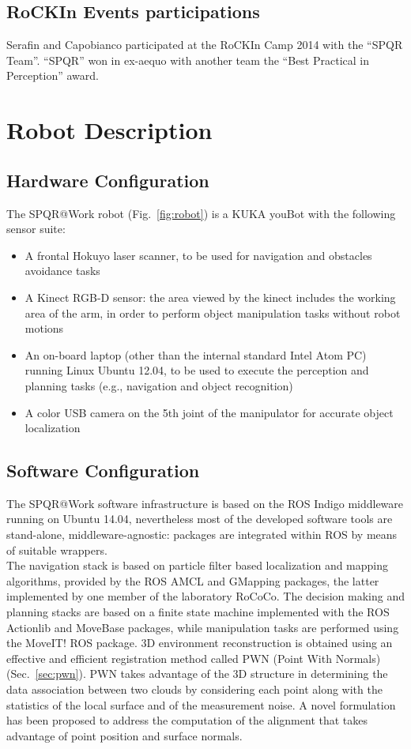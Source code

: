 \documentclass[conference]{IEEEtran}
\begin{document}
\subsection{RoCKIn Events participations}
Serafin and Capobianco participated at the RoCKIn Camp 2014 with the ``SPQR Team''. ``SPQR'' won in ex-aequo with another team the ``Best Practical in Perception'' award.

\section{Robot Description}

\subsection{Hardware Configuration}

The SPQR@Work robot (Fig.~\ref{fig:robot}) is a KUKA youBot with the following sensor suite:

\begin{itemize}
 \item A frontal Hokuyo laser scanner, to be used for navigation and obstacles avoidance tasks
 \item A Kinect RGB-D sensor: the area viewed by the kinect includes the working area of the arm, in order to perform object manipulation tasks without robot motions
 \item An on-board laptop (other than the internal standard Intel Atom PC) running Linux Ubuntu 12.04, to be used to execute the perception and planning tasks (e.g., navigation and object recognition)
 \item A color USB camera on the 5th joint of the manipulator for accurate object localization
\end{itemize}
 
\subsection{Software Configuration}

The SPQR@Work software infrastructure is based on the ROS Indigo middleware running on Ubuntu 14.04, nevertheless most of the developed software tools are stand-alone, middleware-agnostic: packages are integrated within ROS by means of suitable wrappers.\\
The navigation stack is based on particle filter based localization and mapping algorithms, provided by the ROS AMCL and GMapping packages, the latter implemented by one member of the laboratory RoCoCo. The decision making and planning stacks are based on a finite state machine implemented with the ROS Actionlib and MoveBase packages, while manipulation tasks are performed using the MoveIT! ROS package.
3D environment reconstruction is obtained using an effective and efficient registration method called PWN (Point With Normals) (Sec.~\ref{sec:pwn}). 
PWN takes advantage of the 3D structure in determining the data association between two clouds by considering each point along with the statistics of the local surface and of the measurement noise. A novel formulation has been proposed to address the computation of the alignment that takes advantage of point position and surface normals.\\
\end{document}
